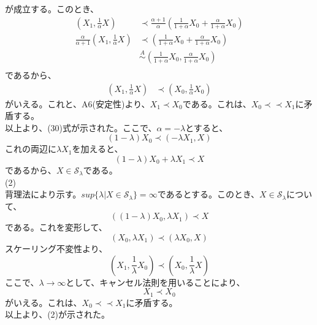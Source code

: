 \documentclass[a4paper,11pt]{jsarticle}
\numberwithin{equation}{section}
\begin{document}
が成立する。このとき、
\begin{align}
    (X_1,\frac{1}{\alpha}X) &\prec \frac{\alpha+1}{\alpha}(\frac{1}{1+\alpha}X_0+\frac{\alpha}{1+\alpha}X_0)\\
    \frac{\alpha}{\alpha+1}(X_1,\frac{1}{\alpha}X) &\prec (\frac{1}{1+\alpha}X_0+\frac{\alpha}{1+\alpha}X_0)\\
    &\overset{A}{\sim} (\frac{1}{1+\alpha}X_0,\frac{\alpha}{1+\alpha}X_0)\\
\end{align}
であるから、
\begin{align}
    (X_1,\frac{1}{\alpha}X) &\prec (X_0,\frac{1}{\alpha}X_0)
\end{align}
がいえる。これと、A6(安定性)より、$X_1 \prec X_0$である。これは、$X_0 \prec \prec X_1$に矛盾する。\\
以上より、(30)式が示された。ここで、$\alpha = -\lambda$とすると、
\begin{equation}
    (1-\lambda)X_0 \prec (-\lambda X_1,X)
\end{equation}
これの両辺に$\lambda X_1$を加えると、
\begin{equation}
    (1-\lambda)X_0 + \lambda X_1 \prec X
\end{equation}
であるから、$X \in \mathcal{S}_{\lambda}$である。\\
(2)\\
背理法により示す。$sup\{\lambda|X \in \mathcal{S}_{\lambda}\}=\infty$であるとする。このとき、$X\in \mathcal{S}_{\lambda}$について、
\begin{equation}
    ((1-\lambda)X_0,\lambda X_1) \prec X
\end{equation}
である。これを変形して、
\begin{equation}
    (X_0,\lambda X_1) \prec (\lambda X_0,X)
\end{equation}
スケーリング不変性より、
\begin{equation}
    (X_1,\frac{1}{\lambda}X_0) \prec (X_0,\frac{1}{\lambda}X)
\end{equation}  
ここで、$\lambda \rightarrow \infty$として、キャンセル法則を用いることにより、
\begin{equation}
    X_1 \prec X_0
\end{equation}
がいえる。これは、$X_0 \prec \prec X_1$に矛盾する。\\
以上より、(2)が示された。\hfill\qedsymbol\\
\end{document}
